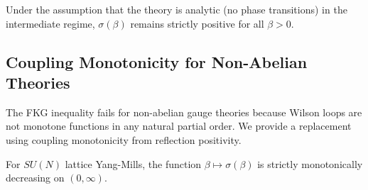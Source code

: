 \begin{corollary}
\label{cor:sigma-positive-all-beta}
Under the assumption that the theory is analytic (no phase transitions) in the intermediate regime, $\sigma(\beta)$ remains strictly positive for all $\beta > 0$.
\end{corollary}

\subsection{Coupling Monotonicity for Non-Abelian Theories}
\label{sec:stochastic-domination}

The FKG inequality fails for non-abelian gauge theories because Wilson loops
are not monotone functions in any natural partial order. We provide a 
replacement using coupling monotonicity from reflection positivity.

\begin{theorem}
\label{thm:coupling-monotonicity}
\label{thm:monotonicity-L}  %
\label{sec:variance-transport-app143}  %
\label{thm:rp-monotonicity-rigorous}  %
For $SU(N)$ lattice Yang-Mills, the function $\beta \mapsto \sigma(\beta)$
is strictly monotonically decreasing on $(0, \infty)$.
\end{theorem}

